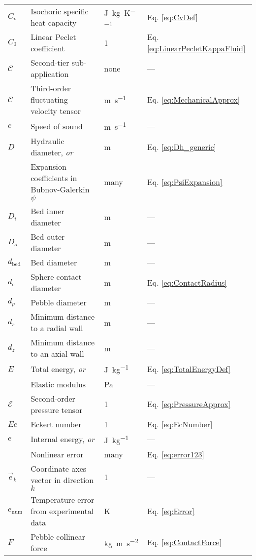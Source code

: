 \begin{longtable}{p{2cm}p{9cm}p{2cm}p{5cm}}
\(C_v\) & Isochoric specific heat capacity & \si{\joule\per\kilo\gram\per\kelvin} & Eq. \eqref{eq:CvDef}\\
\(C_0\) & Linear Peclet coefficient & 1 & Eq. \eqref{eq:LinearPecletKappaFluid}\\
\(\mathcal{C}\) & Second-tier sub-application & none & ---\\
\(\mathscr{C}\) & Third-order fluctuating velocity tensor & \si{\meter\per\second} & Eq. \eqref{eq:MechanicalApprox}\\
\(c\) & Speed of sound & \si{\meter\per\second} & ---\\
\(D\) & Hydraulic diameter, \textit{or} & \si{\meter} & Eq. \eqref{eq:Dh_generic}\\
& Expansion coefficients in Bubnov-Galerkin \(\psi\) & many & Eq. \eqref{eq:PsiExpansion}\\
\(D_i\) & Bed inner diameter & \si{\meter} & ---\\
\(D_o\) & Bed outer diameter & \si{\meter} & ---\\
\(d_\text{bed}\) & Bed diameter & \si{\meter} & ---\\
\(d_c\) & Sphere contact diameter & \si{\meter} & Eq. \eqref{eq:ContactRadius}\\
\(d_p\) & Pebble diameter & \si{\meter} & ---\\
\(d_r\) & Minimum distance to a radial wall & \si{\meter} & ---\\
\(d_z\) & Minimum distance to an axial wall & \si{\meter} & ---\\
\(E\) & Total energy, \textit{or} & \si{\joule\per\kilo\gram} & Eq. \eqref{eq:TotalEnergyDef}\\
 & Elastic modulus & \si{\pascal} & ---\\
 \(\mathscr{E}\) & Second-order pressure tensor & 1 & Eq. \eqref{eq:PressureApprox}\\
 \(Ec\) & Eckert number & 1 & Eq. \eqref{eq:EcNumber}\\
\(e\) & Internal energy, \textit{or} & \si{\joule\per\kilo\gram} & ---\\
& Nonlinear error & many & Eq. \eqref{eq:error123}\\
\(\vec{e}_k\) & Coordinate axes vector in direction \(k\) & 1 & ---\\
\(e_\text{num}\) & Temperature error from experimental data & \si{\kelvin} & Eq. \eqref{eq:Error}\\
\(F\) & Pebble collinear force & \si{\kilo\gram\meter\per\square\second} & Eq. \eqref{eq:ContactForce}\\

\end{longtable}
